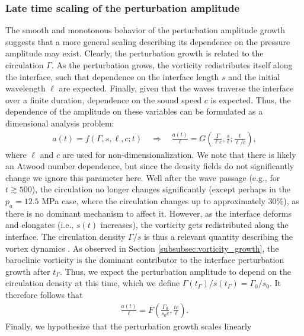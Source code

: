 \documentclass{jfm}%
\begin{document}
\subsubsection{Late time scaling of the perturbation amplitude}
The smooth and monotonous behavior of the perturbation amplitude
growth suggests that a more general scaling describing its dependence
on the pressure amplitude may exist.  Clearly, the perturbation growth
is related to the circulation $\Gamma$. As the perturbation grows, the
vorticity redistributes itself along the interface, such that
dependence on the interface length $s$ and the initial wavelength
$\ell$ are expected. Finally, given that the waves traverse the
interface over a finite duration, dependence on the sound speed $c$ is
expected. Thus, the dependence of the amplitude on these variables can
be formulated as a dimensional analysis problem:
\begin{align}
  \label{eq:dimensional_amplitude}
  a(t)=f(\Gamma, s, \ell, c; t) \quad \Rightarrow \quad
  \frac{a(t)}{\ell} = G\left(\frac{\Gamma}{\ell c}, \frac{s}{\ell};
  \frac{t}{\ell/c}\right),
\end{align}
where $\ell$ and $c$ are used for non-dimensionalization. We note that
there is likely an Atwood number dependence, but since the density
fields do not significantly change we ignore this parameter here. Well
after the wave passage (e.g., for $t\gtrsim 500$), the circulation no
longer changes significantly (except perhaps in the $p_a = 12.5$ MPa
case, where the circulation changes up to approximately 30\%), as
there is no dominant mechanism to affect it. However, as the interface
deforms and elongates (i.e., $s(t)$ increases), the vorticity gets
redistributed along the interface.  The circulation density
$\Gamma / s$ is thus a relevant quantity describing the vortex
dynamics \cite[]{Pozrikidis2000}. As observed in Section
\ref{subsubsec:vorticity_growth}, the baroclinic vorticity is the
dominant contributor to the interface perturbation growth after
$t_\Gamma$. Thus, we expect the perturbation amplitude to depend on
the circulation density at this time, which we define
$\Gamma(t_\Gamma)/s(t_\Gamma) = \Gamma_0 / s_0$. It therefore follows
that
% 
\begin{align}
  \label{eq:dimensionless_groups}
  \frac{a(t)}{\ell}=F\left(\frac{\Gamma_0}{s_0 c}, \frac{t c}{\ell} \right).
\end{align}
% 
Finally, we hypothesize that the perturbation growth scales linearly
\end{document}
